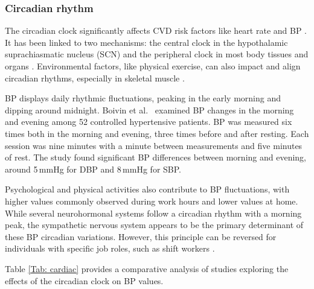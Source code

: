 \documentclass[journal,article,moreauthors]{Definitions/mdpi}
\begin{document}
\subsubsection{Circadian rhythm}
The circadian clock significantly affects CVD risk factors like heart rate and BP \citep{Morris2012}. It has been linked to two mechanisms: the central clock in the hypothalamic suprachiasmatic nucleus (SCN) and the peripheral clock in most body tissues and organs \citep{Richards2012}. Environmental factors, like physical exercise, can also impact and align circadian rhythms, especially in skeletal muscle \citep{hower2018circadian}.

BP displays daily rhythmic fluctuations, peaking in the early morning and dipping around midnight. Boivin et al.\ \citep{Boivin2014-ss} examined BP changes in the morning and evening among 52 controlled hypertensive patients. BP was measured six times both in the morning and evening, three times before and after resting. Each session was nine minutes with a minute between measurements and five minutes of rest. The study found significant BP differences between morning and evening, around 5\,mmHg for DBP and 8\,mmHg for SBP.

Psychological and physical activities also contribute to BP fluctuations, with higher values commonly observed during work hours and lower values at home. While several neurohormonal systems follow a circadian rhythm with a morning peak, the sympathetic nervous system appears to be the primary determinant of these BP circadian variations. However, this principle can be reversed for individuals with specific job roles, such as shift workers \citep{hassler2005circadian}.

Table \ref{Tab: cardiac} provides a comparative analysis of studies exploring the effects of the circadian clock on BP values.
\end{document}
